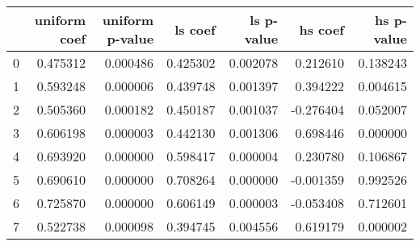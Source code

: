 \begin{tabular}{lrrrrrr}
\toprule
 & uniform coef & uniform p-value & ls coef & ls p-value & hs coef & hs p-value \\
\midrule
0 & 0.475312 & 0.000486 & 0.425302 & 0.002078 & 0.212610 & 0.138243 \\
1 & 0.593248 & 0.000006 & 0.439748 & 0.001397 & 0.394222 & 0.004615 \\
2 & 0.505360 & 0.000182 & 0.450187 & 0.001037 & -0.276404 & 0.052007 \\
3 & 0.606198 & 0.000003 & 0.442130 & 0.001306 & 0.698446 & 0.000000 \\
4 & 0.693920 & 0.000000 & 0.598417 & 0.000004 & 0.230780 & 0.106867 \\
5 & 0.690610 & 0.000000 & 0.708264 & 0.000000 & -0.001359 & 0.992526 \\
6 & 0.725870 & 0.000000 & 0.606149 & 0.000003 & -0.053408 & 0.712601 \\
7 & 0.522738 & 0.000098 & 0.394745 & 0.004556 & 0.619179 & 0.000002 \\
\bottomrule
\end{tabular}

